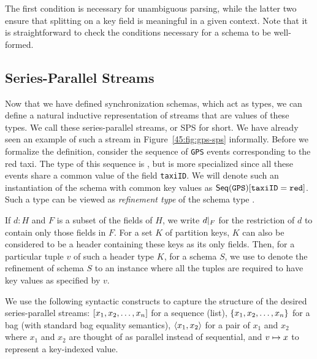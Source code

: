 The first condition is necessary for unambiguous parsing, while the latter two
ensure that splitting on a key field is meaningful in a given context.
Note that it is straightforward to check the conditions necessary for a schema to be well-formed.

\subsection{Series-Parallel Streams}
\label{45:sec:streams}

Now that we have defined synchronization schemas, which act as types, we can define a natural inductive representation of streams that are values of these types. We call these series-parallel streams, or SPS for short.
We have already seen an example of such a stream in Figure~\ref{45:fig:gps-sps} informally.
Before we formalize the definition, consider the sequence of \texttt{GPS} events corresponding
to the red taxi. The type of this sequence is , but is more specialized
since all these events share a common value of the field \texttt{taxiID}.
We will denote such an instantiation of the schema with common key values
as $\spstype{\texttt{taxiID}=\texttt{red}}{\seqleaf{\texttt{GPS}}}$. Such a type can
be viewed as {\em refinement type} of the schema type .

If $d : H$ and $F$ is a subset of the fields of $H$, we write $\tuprestrict{d}{F}$ for
the restriction of $d$ to contain only those fields in $F$.
For a set $K$ of partition keys, $K$ can also be considered to be a header containing these keys as its only fields.
Then, for a particular tuple $v$ of such a header type $K$, for a schema $S$, we use
 to denote the refinement of schema $S$ to an instance where all the tuples
are required to have key values as specified by $v$.

We use the following syntactic constructs to capture the structure of the desired series-parallel streams: $\spsseq{x_1, x_2, \ldots, x_n}$ for
a sequence (list), $\spsbag{x_1, x_2, \ldots, x_n}$ for a bag (with standard bag
equality semantics), $\spspargen{x_1, x_2}$ for a pair of $x_1$ and $x_2$ where
$x_1$ and $x_2$ are thought of as parallel instead of sequential,
and $\keyed{v}{x}$ to represent a key-indexed value.

